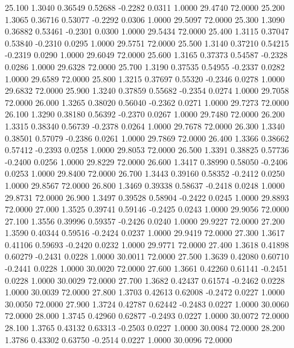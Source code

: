   25.100   1.3040   0.36549   0.52688  -0.2282   0.0311   1.0000  29.4740  72.0000
  25.200   1.3065   0.36716   0.53077  -0.2292   0.0306   1.0000  29.5097  72.0000
  25.300   1.3090   0.36882   0.53461  -0.2301   0.0300   1.0000  29.5434  72.0000
  25.400   1.3115   0.37047   0.53840  -0.2310   0.0295   1.0000  29.5751  72.0000
  25.500   1.3140   0.37210   0.54215  -0.2319   0.0290   1.0000  29.6049  72.0000
  25.600   1.3165   0.37373   0.54587  -0.2328   0.0286   1.0000  29.6328  72.0000
  25.700   1.3190   0.37535   0.54955  -0.2337   0.0282   1.0000  29.6589  72.0000
  25.800   1.3215   0.37697   0.55320  -0.2346   0.0278   1.0000  29.6832  72.0000
  25.900   1.3240   0.37859   0.55682  -0.2354   0.0274   1.0000  29.7058  72.0000
  26.000   1.3265   0.38020   0.56040  -0.2362   0.0271   1.0000  29.7273  72.0000
  26.100   1.3290   0.38180   0.56392  -0.2370   0.0267   1.0000  29.7480  72.0000
  26.200   1.3315   0.38340   0.56739  -0.2378   0.0264   1.0000  29.7678  72.0000
  26.300   1.3340   0.38501   0.57079  -0.2386   0.0261   1.0000  29.7869  72.0000
  26.400   1.3366   0.38662   0.57412  -0.2393   0.0258   1.0000  29.8053  72.0000
  26.500   1.3391   0.38825   0.57736  -0.2400   0.0256   1.0000  29.8229  72.0000
  26.600   1.3417   0.38990   0.58050  -0.2406   0.0253   1.0000  29.8400  72.0000
  26.700   1.3443   0.39160   0.58352  -0.2412   0.0250   1.0000  29.8567  72.0000
  26.800   1.3469   0.39338   0.58637  -0.2418   0.0248   1.0000  29.8731  72.0000
  26.900   1.3497   0.39528   0.58904  -0.2422   0.0245   1.0000  29.8893  72.0000
  27.000   1.3525   0.39741   0.59146  -0.2425   0.0243   1.0000  29.9056  72.0000
  27.100   1.3556   0.39996   0.59357  -0.2426   0.0240   1.0000  29.9227  72.0000
  27.200   1.3590   0.40344   0.59516  -0.2424   0.0237   1.0000  29.9419  72.0000
  27.300   1.3617   0.41106   0.59693  -0.2420   0.0232   1.0000  29.9771  72.0000
  27.400   1.3618   0.41898   0.60279  -0.2431   0.0228   1.0000  30.0011  72.0000
  27.500   1.3639   0.42080   0.60710  -0.2441   0.0228   1.0000  30.0020  72.0000
  27.600   1.3661   0.42260   0.61141  -0.2451   0.0228   1.0000  30.0029  72.0000
  27.700   1.3682   0.42437   0.61574  -0.2462   0.0228   1.0000  30.0039  72.0000
  27.800   1.3703   0.42613   0.62008  -0.2472   0.0227   1.0000  30.0050  72.0000
  27.900   1.3724   0.42787   0.62442  -0.2483   0.0227   1.0000  30.0060  72.0000
  28.000   1.3745   0.42960   0.62877  -0.2493   0.0227   1.0000  30.0072  72.0000
  28.100   1.3765   0.43132   0.63313  -0.2503   0.0227   1.0000  30.0084  72.0000
  28.200   1.3786   0.43302   0.63750  -0.2514   0.0227   1.0000  30.0096  72.0000
